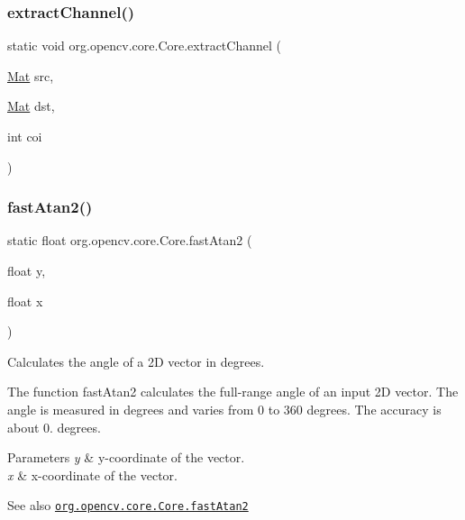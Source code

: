 \subsubsection{\texorpdfstring{extract\+Channel()}{extractChannel()}}
{\footnotesize\ttfamily static void org.\+opencv.\+core.\+Core.\+extract\+Channel (\begin{DoxyParamCaption}\item[{\mbox{\hyperlink{classorg_1_1opencv_1_1core_1_1_mat}{Mat}}}]{src,  }\item[{\mbox{\hyperlink{classorg_1_1opencv_1_1core_1_1_mat}{Mat}}}]{dst,  }\item[{int}]{coi }\end{DoxyParamCaption})\hspace{0.3cm}{\ttfamily [static]}}

\mbox{\label{classorg_1_1opencv_1_1core_1_1_core_aeb2a09f9bb80c8c33e4b5074078d892c}} 
\subsubsection{\texorpdfstring{fast\+Atan2()}{fastAtan2()}}
{\footnotesize\ttfamily static float org.\+opencv.\+core.\+Core.\+fast\+Atan2 (\begin{DoxyParamCaption}\item[{float}]{y,  }\item[{float}]{x }\end{DoxyParamCaption})\hspace{0.3cm}{\ttfamily [static]}}

Calculates the angle of a 2D vector in degrees.

The function {\ttfamily fast\+Atan2} calculates the full-\/range angle of an input 2D vector. The angle is measured in degrees and varies from 0 to 360 degrees. The accuracy is about 0. degrees.


\begin{DoxyParams}{Parameters}
{\em y} & y-\/coordinate of the vector. \\
\hline
{\em x} & x-\/coordinate of the vector.\\
\hline
\end{DoxyParams}
\begin{DoxySeeAlso}{See also}
\href{http://docs.opencv.org/modules/core/doc/utility_and_system_functions_and_macros.html#fastatan2}{\tt org.\+opencv.\+core.\+Core.\+fast\+Atan2} 
\end{DoxySeeAlso}
\mbox{\label{classorg_1_1opencv_1_1core_1_1_core_ad5886a0bea843f9e8b5d6680309b53a7}} 
